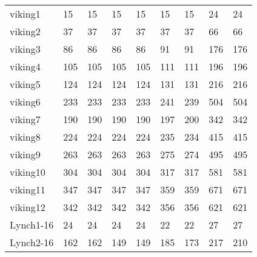 \begin{table}
\begin{adjustbox}{max totalheight=\textheight}
\begin{tabular}{|l|llllllll|}
    viking1            & 15                & 15                & 15                & 15                & 15       & 15       & 24       & 24       \\
    viking2            & 37                & 37                & 37                & 37                & 37       & 37       & 66       & 66       \\
    viking3            & 86                & 86                & 86                & 86                & 91       & 91       & 176      & 176      \\
    viking4            & 105               & 105               & 105               & 105               & 111      & 111      & 196      & 196      \\
    viking5            & 124               & 124               & 124               & 124               & 131      & 131      & 216      & 216      \\
    viking6            & 233               & 233               & 233               & 233               & 241      & 239      & 504      & 504      \\
    viking7            & 190               & 190               & 190               & 190               & 197      & 200      & 342      & 342      \\
    viking8            & 224               & 224               & 224               & 224               & 235      & 234      & 415      & 415      \\
    viking9            & 263               & 263               & 263               & 263               & 275      & 274      & 495      & 495      \\
    viking10           & 304               & 304               & 304               & 304               & 317      & 317      & 581      & 581      \\
    viking11           & 347               & 347               & 347               & 347               & 359      & 359      & 671      & 671      \\
    viking12           & 342               & 342               & 342               & 342               & 356      & 356      & 621      & 621      \\ \hline
    Lynch1-16          & 24                & 24                & 24                & 24                & 22       & 22       & 27       & 27       \\
    Lynch2-16          & 162               & 162               & 149               & 149               & 185      & 173      & 217      & 210      \\

\end{tabular}
\end{adjustbox}
\end{table}
